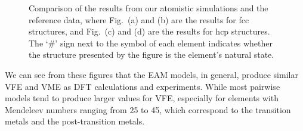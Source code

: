 \documentclass[%
 reprint,
 amsmath,amssymb,
 aps,
]{revtex4-1}
\begin{document}
\noindent\begin{figure}
\centering
\noindent\ignorespaces
{}
\newline
{}
\newline
{}
\newline
{}
\caption{\label{fig:compare}
 Comparison of the results from our atomistic simulations and the reference data, where Fig.~(a) and (b) are the results for fcc structures, and Fig.~(c) and (d) are the results for hcp structures.
 The `\#' sign next to the symbol of each element indicates whether the structure presented by the figure is the element's natural state.
}
\end{figure}

We can see from these figures that the EAM models, in general, produce similar VFE and VME as DFT calculations and experiments.
While most pairwise models tend to produce larger values for VFE, especially for elements with Mendeleev numbers ranging from 25 to 45, which correspond to the transition metals and the post-transition metals.
\end{document}

